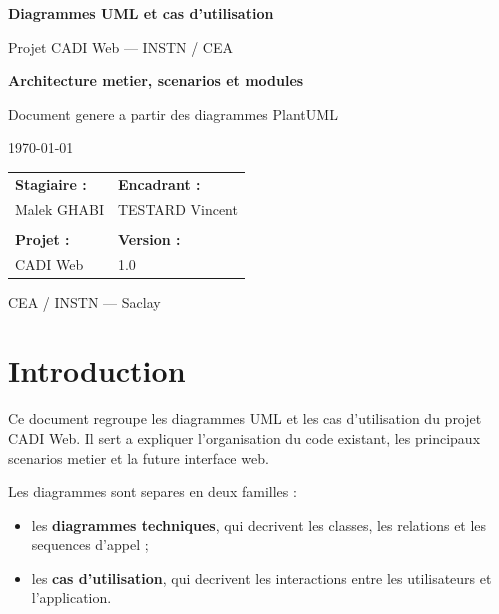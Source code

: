 ﻿\documentclass[11pt,a4paper]{report}
\begin{document}
\begin{titlepage}
\begin{center}
\vspace*{1cm}

{\Huge \bfseries Diagrammes UML et cas d'utilisation \par}
\vspace{0.4cm}
{\Large Projet CADI Web --- INSTN / CEA \par}
\vspace{0.8cm}
{\LARGE \textbf{Architecture metier, scenarios et modules} \par}

\vspace{1.5cm}
{\large Document genere a partir des diagrammes PlantUML \par}
{\large \today \par}

\vspace{2cm}
\begin{tabular}{p{6cm} p{6cm}}
\textbf{Stagiaire :} & \textbf{Encadrant :} \\
Malek GHABI & TESTARD Vincent \\
\\[-2pt]
\textbf{Projet :} & \textbf{Version :} \\
CADI Web & 1.0 \\
\end{tabular}

\vfill
{\small CEA / INSTN --- Saclay}
\end{center}
\end{titlepage}

\setcounter{page}{1}
\tableofcontents
\newpage

\chapter{Introduction}

Ce document regroupe les diagrammes UML et les cas d'utilisation du projet CADI Web.
Il sert a expliquer l'organisation du code existant, les principaux scenarios metier et la future interface web.

Les diagrammes sont separes en deux familles :

\begin{itemize}
  \item les \textbf{diagrammes techniques}, qui decrivent les classes, les relations et les sequences d'appel ;
  \item les \textbf{cas d'utilisation}, qui decrivent les interactions entre les utilisateurs et l'application.
\end{itemize}
\end{document}
